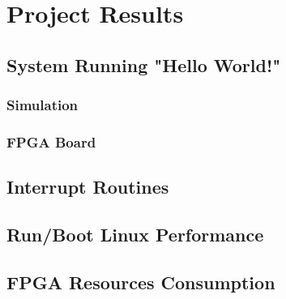\chapter{Project Results}

\section{System Running "Hello World!"}
\subsection{Simulation}
\subsection{FPGA Board}

\section{Interrupt Routines}

\section{Run/Boot Linux Performance}

\section{FPGA Resources Consumption}